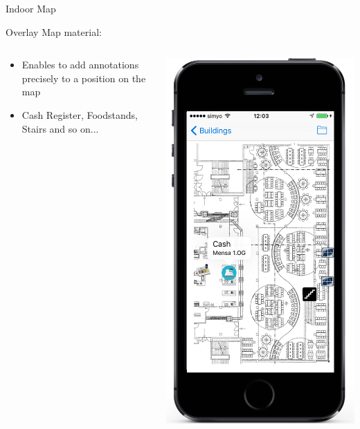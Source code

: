 \documentclass[11pt]{beamer}
\begin{document}
\begin{frame}{Indoor Map}

Overlay Map material:

  \begin{columns}[T]
  \begin{column}{.6\textwidth}
  \begin{itemize}
    \item Enables to add annotations precisely to a position on the map
    \item Cash Register, Foodstands, Stairs and so on...
  \end{itemize}
  \end{column}
  \begin{column}{.4\textwidth}
  \includegraphics[scale=0.25]{mapmensainfo}
  \end{column}
\end{columns}

\end{frame}
\end{document}
